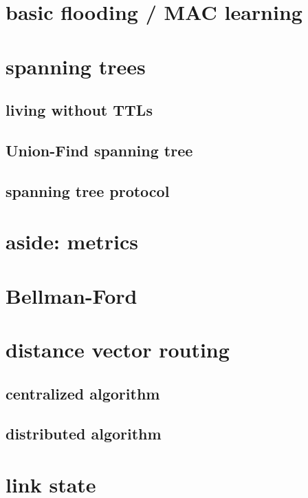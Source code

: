 \section{basic flooding / MAC learning}


\section{spanning trees}


\subsection{living without TTLs}

\subsection{Union-Find spanning tree}

\subsection{spanning tree protocol}

\section{aside: metrics}

\section{Bellman-Ford}

\section{distance vector routing}

\subsection{centralized algorithm}

\subsection{distributed algorithm}

\section{link state}


